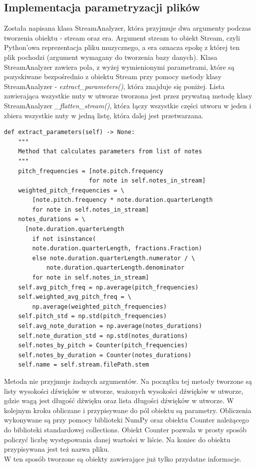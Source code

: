 \documentclass[printmode, eng, openany]{mgr}
\newcommand\tab[1][1cm]{\hspace*{#1}}
\begin{document}
\subsection{Implementacja parametryzacji plików}
\tab Została napisana klasa StreamAnalyzer, która przyjmuje dwa argumenty podczas tworzenia obiektu - stream oraz era. Argument stream to obiekt Stream, czyli Python'owa reprezentacja pliku muzycznego, a era oznacza epokę z której ten plik pochodzi (argument wymagany do tworzenia bazy danych). Klasa StreamAnalyzer zawiera pola, z wyżej wymienionymi parametrami, które są pozyskiwane bezpośrednio z obiektu Stream przy pomocy metody klasy StreamAnalyzer - \textit{extract\_parameters()}, która znajduje się poniżej.
\tab Lista zawierająca wszystkie nuty w utworze tworzona jest przez prywatną metodę klasy StreamAnalyzer \textit{\_flatten\_stream()}, która łączy wszystkie części utworu w jeden i zbiera wszystkie nuty w jedną listę, która dalej jest przetwarzana.
\begin{lstlisting}
def extract_parameters(self) -> None:
    """
    Method that calculates parameters from list of notes
    """
    pitch_frequencies = [note.pitch.frequency
                        for note in self.notes_in_stream]
    weighted_pitch_frequencies = \
    	[note.pitch.frequency * note.duration.quarterLength
        for note in self.notes_in_stream]
    notes_durations = \
      [note.duration.quarterLength
        if not isinstance(
        note.duration.quarterLength, fractions.Fraction)
        else note.duration.quarterLength.numerator / \
            note.duration.quarterLength.denominator
        for note in self.notes_in_stream]
    self.avg_pitch_freq = np.average(pitch_frequencies)
    self.weighted_avg_pitch_freq = \
        np.average(weighted_pitch_frequencies)
    self.pitch_std = np.std(pitch_frequencies)
    self.avg_note_duration = np.average(notes_durations)
    self.note_duration_std = np.std(notes_durations)
    self.notes_by_pitch = Counter(pitch_frequencies)
    self.notes_by_duration = Counter(notes_durations)
    self.name = self.stream.filePath.stem
\end{lstlisting}
\tab Metoda nie przyjmuje żadnych argumentów. Na początku tej metody tworzone są listy wysokości dźwięków w utworze, ważonych wysokości dźwięków w utworze, gdzie wagą jest długość dźwięku oraz lista długości dźwięków w utworze. W kolejnym kroku obliczane i przypisywane do pól obiektu są parametry. Obliczenia wykonywane są przy pomocy biblioteki NumPy oraz obiektu Counter należącego do biblioteki standardowej collections. Obiekt Counter pozwala w prosty sposób policzyć liczbę występowania danej wartości w liście. Na koniec do obiektu przypisywana jest też nazwa pliku.\\
\tab W ten sposób tworzone są obiekty zawierające już tylko przydatne informacje. 
\end{document}
